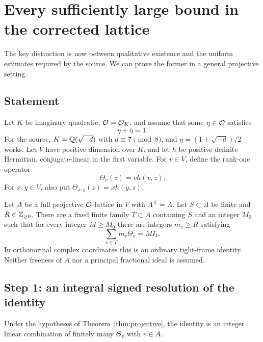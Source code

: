 \section{Every sufficiently large bound in the corrected lattice}
\label{sec:projective}

The key distinction is now between qualitative existence and the uniform estimates required by the source. We can prove the former in a general projective setting.

\subsection{Statement}

Let $K$ be imaginary quadratic, $\mathcal O=\mathcal O_K$, and assume that some $\eta\in\mathcal O$ satisfies
\begin{equation}\label{eq:traceone}
 \eta+\overline\eta=1.
\end{equation}
For the source, $K=\mathbb Q(\sqrt{-d})$ with $d\equiv7\pmod8$, and $\eta=(1+\sqrt{-d})/2$ works. Let $V$ have positive dimension over $K$, and let $h$ be positive definite Hermitian, conjugate-linear in the first variable. For $v\in V$, define the rank-one operator
\[
 \Theta_v(z)=v h(v,z).
\]
For $x,y\in V$, also put $\Theta_{x,y}(z)=x h(y,z)$.

\begin{theorem}\label{thm:projective}
Let $A$ be a full projective $\mathcal O$-lattice in $V$ with $A^\#=A$. Let $S\subset A$ be finite and $R\in\mathbb Z_{\ge0}$. There are a fixed finite family $T\subset A$ containing $S$ and an integer $M_0$ such that for every integer $M\ge M_0$ there are integers $m_v\ge R$ satisfying
\begin{equation}\label{eq:projective-frame}
 \sum_{v\in T}m_v\Theta_v=M I_V.
\end{equation}
In orthonormal complex coordinates this is an ordinary tight-frame identity. Neither freeness of $A$ nor a principal fractional ideal is assumed.
\end{theorem}

\subsection{Step 1: an integral signed resolution of the identity}

\begin{lemma}\label{lem:signed}
Under the hypotheses of Theorem~\ref{thm:projective}, the identity is an integer linear combination of finitely many $\Theta_v$ with $v\in A$.
\end{lemma}

